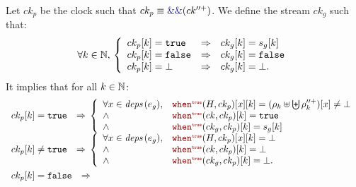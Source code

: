 \begin{skippableproof}
    Let $ck_p$ be the clock such that $ck_p \equiv \kwf{\&\&}(ck^{\prime\prime+})$. We define the
    stream $ck_g$ such that:
    \begin{equation*}
        \forall k \in \mathbb{N}, \,
        \left\{
        \begin{array}{lll}
            ck_p[k] = \mathtt{{true}}  & \Rightarrow & ck_g[k] = s_g[k] \\
            ck_p[k] = \mathtt{{false}} & \Rightarrow & ck_g[k] = \mathtt{{false}} \\
            ck_p[k] = \bot   & \Rightarrow & ck_g[k] = \bot.  \\
        \end{array}
        \right.
    \end{equation*}
    It implies that for all $k \in \mathbb{N}$:
    \begin{align}
         & \begin{array}{ll}
               ck_p[k] = \true    & \Rightarrow \,
               \left\{
               \begin{array}{ll}
                \forall x \in \deps{e_g}, & \whenT{H}{ck_p}[x][k] =
                (\rho_k \ctxconcat \bigCtxconcat \rho^{\prime\prime+}_k)[x] \neq \bot \\
                \wedge                    & \whenT{ck}{ck_p}[k] = \true               \\
                \wedge                    & \whenT{ck_g}{ck_p}[k] = s_g[k]            \\
            \end{array}
               \right.                             \\
               ck_p[k] \neq \true & \Rightarrow \,
               \left\{
               \begin{array}{ll}
                \forall x \in \deps{e_g}, & \whenT{H}{ck_p}[x][k] = \bot  \\
                \wedge                    & \whenT{ck}{ck_p}[k] = \bot    \\
                \wedge                    & \whenT{ck_g}{ck_p}[k] = \bot. \\
            \end{array}
               \right.                             \\
           \end{array} \label{eq:semantics:grsync:theorems:equivalence:pats:whenT} \\
         & \begin{array}{ll}
               ck_p[k] = \false    & \Rightarrow \,

\end{array}
\end{align}
\end{skippableproof}

